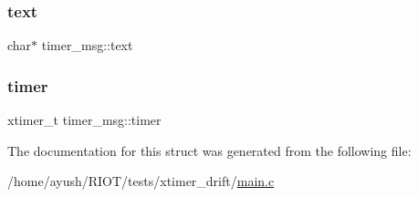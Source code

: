 \subsubsection{\texorpdfstring{text}{text}}
{\footnotesize\ttfamily char$\ast$ timer\+\_\+msg\+::text}

\mbox{\label{structtimer__msg_ade2adc6d3a23d119680f640ac9d98898}} 
\subsubsection{\texorpdfstring{timer}{timer}}
{\footnotesize\ttfamily xtimer\+\_\+t timer\+\_\+msg\+::timer}



The documentation for this struct was generated from the following file\+:\begin{DoxyCompactItemize}
\item 
/home/ayush/\+R\+I\+O\+T/tests/xtimer\+\_\+drift/\hyperlink{xtimer__drift_2main_8c}{main.\+c}\end{DoxyCompactItemize}
